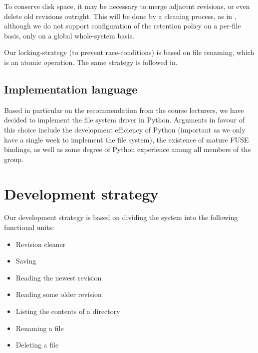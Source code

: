 \documentclass[12pt]{article}
\begin{document}
To conserve disk space, it may be necessary to merge adjacent
revisions, or even delete old revisions outright.  This will be done
by a cleaning process, as in \cite{319159}, although we do not support
configuration of the retention policy on a per-file basis, only on a
global whole-system basis.

Our locking-strategy (to prevent race-conditions) is based on file
renaming, which is an atomic operation.  The same strategy is followed
in.\cite{Santry:1999gf}

\subsection{Implementation language}

Based in particular on the recommendation from the course lecturers,
we have decided to implement the file system driver in Python.
Arguments in favour of this choice include the development efficiency
of Python (important as we only have a single week to implement the
file system), the existence of mature FUSE bindings, as well as some
degree of Python experience among all members of the group.

\section{Development strategy}

Our development strategy is based on dividing the system into the
following functional units:

\begin{itemize}
\item Revision cleaner
\item Saving
\item Reading the newest revision
\item Reading some older revision
\item Listing the contents of a directory
\item Renaming a file
\item Deleting a file
\end{itemize}



 
\end{document}
